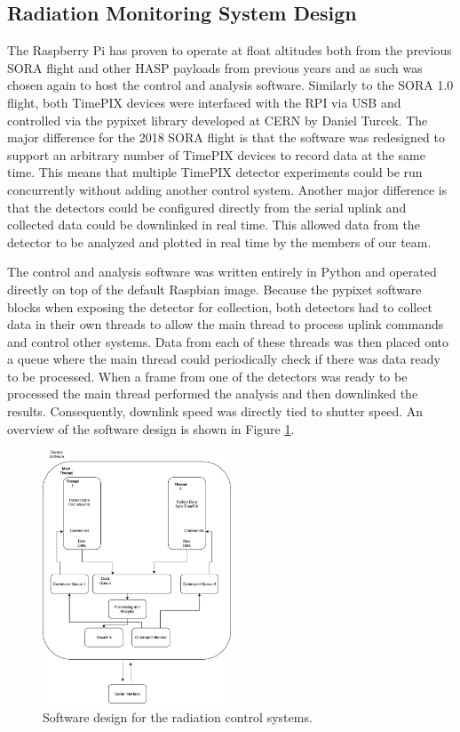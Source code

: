 \subsection{Radiation Monitoring System Design}
\label{sec:Radiation Design}
The Raspberry Pi has proven to operate at float altitudes both from the previous SORA flight and other HASP payloads from previous years and as such was chosen again to host the control and analysis software. Similarly to the SORA 1.0 flight, both TimePIX devices were interfaced with the RPI via USB and controlled via the pypixet library developed at CERN by Daniel Turcek. The major difference for the 2018 SORA flight is that the software was redesigned to support an arbitrary number of TimePIX devices to record data at the same time. This means that multiple TimePIX detector experiments could be run concurrently without adding another control system. Another major difference is that the detectors could be configured directly from the serial uplink and collected data could be downlinked in real time. This allowed data from the detector to be analyzed and plotted in real time by the members of our team.

The control and analysis software was written entirely in Python and operated directly on top of the default Raspbian image. Because the pypixet software blocks when exposing the detector for collection, both detectors had to collect data in their own threads to allow the main thread to process uplink commands and control other systems. Data from each of these threads was then placed onto a queue where the main thread could periodically check if there was data ready to be processed. When a frame from one of the detectors was ready to be processed the main thread performed the analysis and then downlinked the results. Consequently, downlink speed was directly tied to shutter speed. An overview of the software design is shown in 
Figure \ref{fig:softwaredesign}.


\begin{figure}[h!]
	\begin{center}
	\includegraphics[width=0.5\textwidth]{figures/SoftwareDesign.pdf}
	\caption{Software design for the radiation control systems.}
	\label{fig:softwaredesign}
	\end{center}
\end{figure}
 
